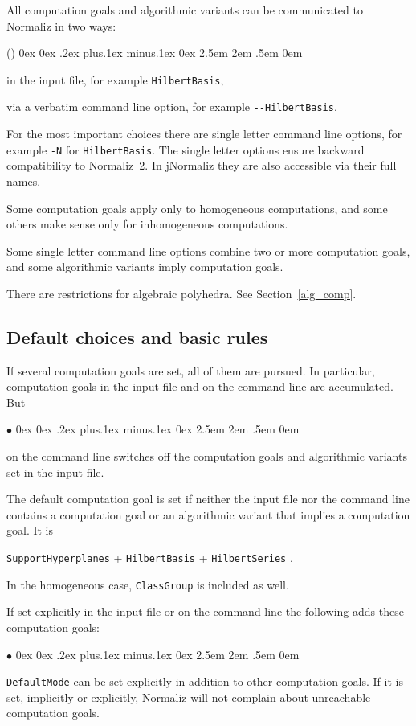 \documentclass[12pt,a4paper]{scrartcl}
\newcounter{listi}
\newcommand{\stdli}{ \topsep0ex \partopsep0ex %
\parsep.2ex plus.1ex minus.1ex \itemsep0ex%
\leftmargin2.5em \labelwidth2em \labelsep.5em \rightmargin0em}%
\newenvironment{arab}{\begin{list}{\textup{(\arabic{listi})}}%
	{\usecounter{listi}\stdli}}{\end{list}}
\renewenvironment{itemize}{\begin{list}{{$\bullet$}}{\stdli}}{\end{list}}
\theoremstyle{definition}
\def\itemtt[#1]{\item[\textbf{\ttt{#1}}]}
\def\ttt{\texttt}
\begin{document}
All computation goals and algorithmic variants can be communicated to Normaliz in two ways:
\begin{arab}
	\item in the input file, for example \verb|HilbertBasis|,
	\item via a verbatim command line option, for example \verb|--HilbertBasis|.
\end{arab}
For the most important choices there are single letter command line options, for example \verb|-N| for \verb|HilbertBasis|. The single letter options ensure backward compatibility to Normaliz~2. In jNormaliz they are also accessible via their full names.

Some computation goals apply only to homogeneous computations, and some others make sense only for inhomogeneous computations.

Some single letter command line options combine two or more computation goals, and some algorithmic variants imply computation goals.

There are restrictions for algebraic polyhedra. See Section~\ref{alg_comp}.

\subsection{Default choices and basic rules}

If several computation goals are set, all of them are pursued. In particular, computation goals in the input file and on the command line are accumulated. But
\begin{itemize}
	\itemtt[-{}-ignore, -i] on the command line switches off the computation goals and algorithmic variants set in the input file.
\end{itemize}

The default computation goal is set if neither the input file nor the command line contains a computation goal or an algorithmic variant that implies a computation goal. It is
\begin{center}
	\verb|SupportHyperplanes| + \verb|HilbertBasis| + \verb|HilbertSeries| .
\end{center}
In the homogeneous case, \verb|ClassGroup| is included as well.

If set explicitly in the input file or on the command line the following adds these computation goals:
\begin{itemize}
	\itemtt[DefaultMode]
\end{itemize}

\verb|DefaultMode| can be set explicitly in addition to other computation goals. If it is set, implicitly or explicitly, Normaliz will not complain about unreachable computation goals.
\end{document}
